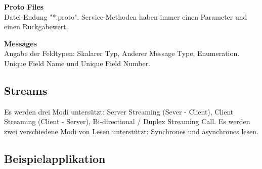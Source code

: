 \textbf{Proto Files} \\
Datei-Endung "*.proto". Service-Methoden haben immer einen Parameter und einen Rückgabewert.

\textbf{Messages} \\
Angabe der Feldtypen: Skalarer Typ, Anderer Message Type, Enumeration. Unique Field Name und Unique Field Number.

\subsection{Streams}
Es werden drei Modi untersützt: Server Streaming (Sever - Client), Client Streaming (Client - Server), Bi-directional / Duplex Streaming Call. Es werden zwei verschiedene Modi von Lesen unterstützt: Synchrones und asynchrones lesen.

\subsection{Beispielapplikation}

\pagebreak
  









